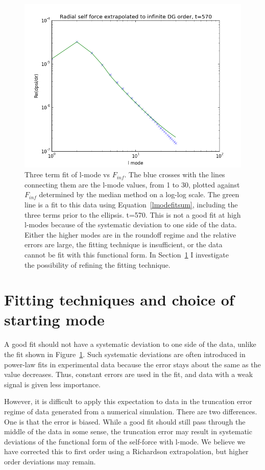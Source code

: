 \begin{figure}
  \includegraphics{finffit570}
  \caption{Three term fit of l-mode vs $F_{inf}$. The blue crosses with the lines connecting them are the l-mode values, from 1 to 30, plotted against $F_{inf}$ determined by the median method on a log-log scale. The green line is a fit to this data using Equation~\ref{lmodefitsum}, including the three terms prior to the ellipsis. t=570. This is not a good fit at high l-modes because of the systematic deviation to one side of the data. Either the higher modes are in the roundoff regime and the relative errors are large, the fitting technique is insufficient, or the data cannot be fit with this functional form. In Section~\ref{fitting} I investigate the possibility of refining the fitting technique.} 
\label{lmodefit}
\end{figure}

\section{Fitting techniques and choice of starting mode}
\label{fitting}
A good fit should not have a systematic deviation to one side of the data, unlike the fit shown in Figure~\ref{lmodefit}. Such systematic deviations are often introduced in power-law fits in experimental data because the error stays about the same as the value decreases. Thus, constant errors are used in the fit, and data with a weak signal is given less importance.

However, it is difficult to apply this expectation to data in the truncation error regime of data generated from a numerical simulation. There are two differences. One is that the error is biased. While a good fit should still pass through the middle of the data in some sense, the truncation error may result in systematic deviations of the functional form of the self-force with l-mode. We believe we have corrected this to first order using a Richardson extrapolation, but higher order deviations may remain.

